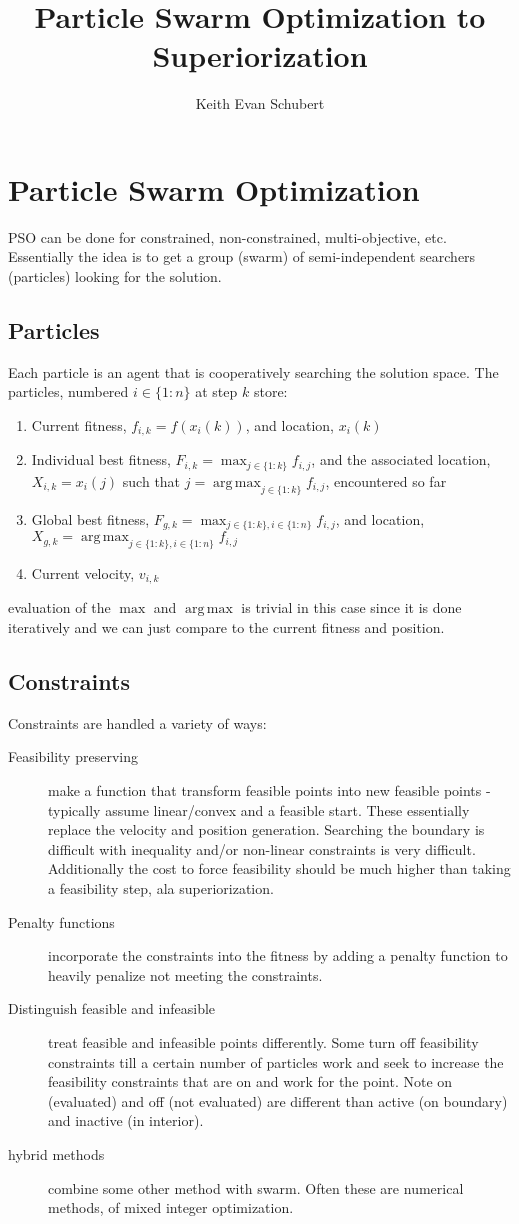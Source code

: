\documentclass{article}
\title{Particle Swarm Optimization to Superiorization}
\author{Keith Evan Schubert}
\DeclareMathOperator*{\argmax}{arg\,max}
\begin{document}
\section{Particle Swarm Optimization}
PSO can be done for constrained, non-constrained, multi-objective, etc.  Essentially the idea is to get a group (swarm) of semi-independent searchers (particles) looking for the solution.
\subsection{Particles}
Each particle is an agent that is cooperatively searching the solution space.  The particles, numbered $i\in\{1:n\}$ at step $k$ store:
\begin{enumerate}
\item Current fitness, $f_{i,k}=f(x_i(k))$, and location, $x_i(k)$
\item Individual best fitness, $F_{i,k}=\max_{j\in\{1:k\}}f_{i,j}$, and the associated location, $X_{i,k}=x_i(j)$ such that
        $j=\argmax_{j\in\{1:k\}}f_{i,j}$, encountered so far
\item Global best fitness, $F_{g,k}=\max_{j\in\{1:k\},i\in\{1:n\}}f_{i,j}$, and location,
        $X_{g,k}=\argmax_{j\in\{1:k\},i\in\{1:n\}}f_{i,j}$
\item Current velocity, $v_{i,k}$
\end{enumerate}
evaluation of the $\max$ and $\argmax$ is trivial in this case since it is done iteratively and we can just compare to the current fitness and position.

\subsection{Constraints}
Constraints are handled a variety of ways:
\begin{description}
\item[Feasibility preserving] make a function that transform feasible points into new feasible points - typically assume linear/convex and a feasible start. These essentially replace the velocity and position generation.  Searching the boundary is difficult with inequality and/or non-linear constraints is very difficult.  Additionally the cost to force feasibility should be much higher than taking a feasibility step, ala superiorization.
\item[Penalty functions]  incorporate the constraints into the fitness by adding a penalty function to heavily penalize not meeting the constraints.
\item[Distinguish feasible and infeasible] treat feasible and infeasible points differently.  Some turn off feasibility constraints till a certain number of particles work and seek to increase the feasibility constraints that are on and work for the point.  Note on (evaluated) and off (not evaluated) are different than active (on boundary) and inactive (in interior).
\item[hybrid methods] combine some other method with swarm.  Often these are numerical methods, of mixed integer optimization.
\end{description}
\end{document}
